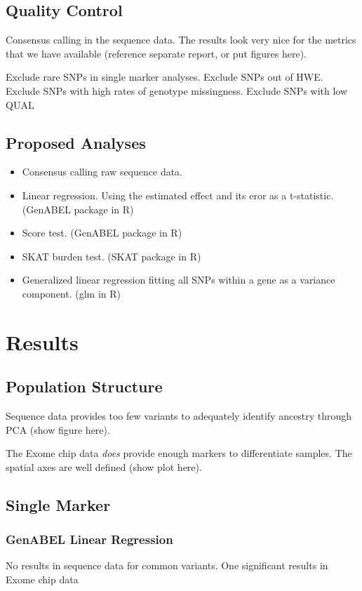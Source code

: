 \documentclass[paper=a4, fontsize=11pt]{scrartcl}	%
\numberwithin{equation}{section}		%
\numberwithin{figure}{section}			%
\numberwithin{table}{section}				%
\begin{document}
	\subsection{Quality Control}
	Consensus calling in the sequence data. The results look very nice for the metrics that we have available (reference separate report, or put figures here).
	
	Exclude rare SNPs in single marker analyses.
	Exclude SNPs out of HWE.
	Exclude SNPs with high rates of genotype missingness.
	Exclude SNPs with low QUAL

	\subsection{Proposed Analyses}
	\begin{itemize}
		\item Consensus calling raw sequence data.
		\item Linear regression. Using the estimated effect and its eror as a t-statistic. (GenABEL package in R)
		\item Score test. (GenABEL package in R)
		\item SKAT burden test. (SKAT package in R)
		\item Generalized linear regression fitting all SNPs within a gene as a variance component. (glm in R)
	\end{itemize}
	
	

\section{Results}

	\subsection{Population Structure}
Sequence data provides too few variants to adequately identify ancestry through PCA (show figure here).

The Exome chip data \emph{does} provide enough markers to differentiate samples. The spatial axes are well defined (show plot here).

	\subsection{Single Marker}
		\subsubsection{GenABEL Linear Regression}
	No results in sequence data for common variants.
	One significant results in Exome chip data
\end{document}
